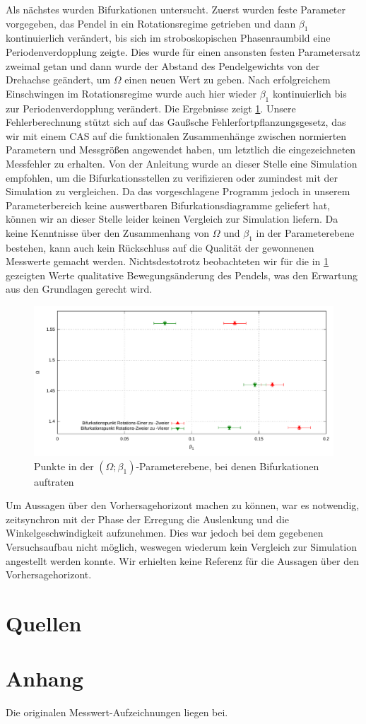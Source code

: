 \documentclass[numbers=noenddot,12pt,a4paper]{scrartcl}
\newcommand{\ix}[1]{_\text{#1}}
\begin{document}
Als nächstes wurden Bifurkationen untersucht. Zuerst wurden feste Parameter vorgegeben, das Pendel in ein Rotationsregime getrieben und dann $\beta\ix{1}$ kontinuierlich verändert, bis sich im stroboskopischen Phasenraumbild eine Periodenverdopplung zeigte. Dies wurde für einen ansonsten festen Parametersatz zweimal getan und dann wurde der Abstand des Pendelgewichts von der Drehachse geändert, um $\Omega$ einen neuen Wert zu geben. Nach erfolgreichem Einschwingen im Rotationsregime wurde auch hier wieder $\beta\ix{1}$ kontinuierlich bis zur Periodenverdopplung verändert. Die Ergebnisse zeigt \ref{img:beef}. Unsere Fehlerberechnung stützt sich auf das Gaußsche Fehlerfortpflanzungsgesetz, das wir mit einem CAS auf die funktionalen Zusammenhänge zwischen normierten Parametern und Messgrößen angewendet haben, um letztlich die eingezeichneten Messfehler zu erhalten. Von der Anleitung wurde an dieser Stelle eine Simulation empfohlen, um die Bifurkationsstellen zu verifizieren oder zumindest mit der Simulation zu vergleichen. Da das vorgeschlagene Programm jedoch in unserem Parameterbereich keine auswertbaren Bifurkationsdiagramme geliefert hat, können wir an dieser Stelle leider keinen Vergleich zur Simulation liefern. Da keine Kenntnisse über den Zusammenhang von $\Omega$ und $\beta\ix{1}$ in der Parameterebene bestehen, kann auch kein Rückschluss auf die Qualität der gewonnenen Messwerte gemacht werden. Nichtsdestotrotz beobachteten  wir für die in \ref{img:beef} gezeigten Werte qualitative Bewegungsänderung des Pendels, was den Erwartung aus den Grundlagen gerecht wird.
\begin{figure}[H]
	\includegraphics[width=\textwidth]{messwerte/beefurkation.pdf}
	\caption{Punkte in der $(\Omega;\beta\ix{1})$-Parameterebene, bei denen Bifurkationen auftraten}
	\label{img:beef}
\end{figure}
Um Aussagen über den Vorhersagehorizont machen zu können, war es notwendig, zeitsynchron mit der Phase der Erregung die Auslenkung und die Winkelgeschwindigkeit aufzunehmen. Dies war jedoch bei dem gegebenen Versuchsaufbau nicht möglich, weswegen wiederum kein Vergleich zur Simulation angestellt werden konnte. Wir erhielten keine Referenz für die Aussagen über den Vorhersagehorizont. 
\section{Quellen}
\section{Anhang}
Die originalen Messwert-Aufzeichnungen liegen bei.
\end{document}
